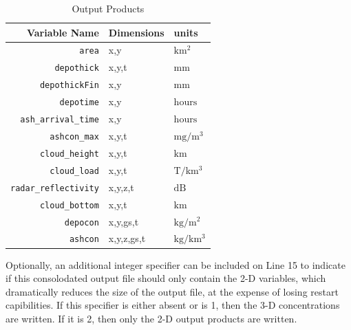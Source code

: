 \small
\begin{table}[htbp]
\begin{center}
\begin{tabular}{|r|l|l|}
\hline
Variable Name                & Dimensions & units\\
\hline
\texttt{area}                & x,y        & $\mathrm{km^2}$   \\
\texttt{depothick}           & x,y,t      & $\mathrm{mm}$     \\
\texttt{depothickFin}        & x,y        & $\mathrm{mm}$     \\
\texttt{depotime}            & x,y        & $\mathrm{hours}$  \\
\texttt{ash\_arrival\_time}  & x,y        & $\mathrm{hours}$  \\
\texttt{ashcon\_max}         & x,y,t      & $\mathrm{mg/m^3}$ \\
\texttt{cloud\_height}       & x,y,t      & $\mathrm{km}$     \\
\texttt{cloud\_load}         & x,y,t      & $\mathrm{T/km^3}$ \\
\texttt{radar\_reflectivity} & x,y,z,t    & $\mathrm{dB}$     \\
\texttt{cloud\_bottom}       & x,y,t      & $\mathrm{km}$     \\
\texttt{depocon}             & x,y,gs,t   & $\mathrm{kg/m^2}$ \\
\texttt{ashcon}              & x,y,z,gs,t & $\mathrm{kg/km^3}$\\
\hline
\end{tabular}
\caption{\label{tab:OutputProduct}Output Products}
\end{center}
\end{table}
\normalsize

Optionally, an additional integer specifier can be included on
Line 15 to indicate if this consolodated output file should only contain the
2-D variables, which dramatically reduces the size of the output file, at the
expense of losing restart capibilities.
If this specifier is either absent or is 1, then the 3-D concentrations are written.
If it is 2, then only the 2-D output products are written.

